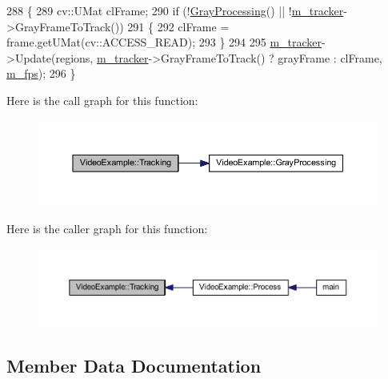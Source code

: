 \begin{DoxyCode}
288 \{
289     cv::UMat clFrame;
290     \textcolor{keywordflow}{if} (!\mbox{\hyperlink{class_video_example_af8ea44f17711129d2b954d1f01fee1f0}{GrayProcessing}}() || !\mbox{\hyperlink{class_video_example_a7c58cd8c883981b2e645d1a3d8edf76a}{m\_tracker}}->GrayFrameToTrack())
291     \{
292         clFrame = frame.getUMat(cv::ACCESS\_READ);
293     \}
294 
295     \mbox{\hyperlink{class_video_example_a7c58cd8c883981b2e645d1a3d8edf76a}{m\_tracker}}->Update(regions, \mbox{\hyperlink{class_video_example_a7c58cd8c883981b2e645d1a3d8edf76a}{m\_tracker}}->GrayFrameToTrack() ? grayFrame : clFrame, 
      \mbox{\hyperlink{class_video_example_ae8110012f8d57f39d6355377cf20fb27}{m\_fps}});
296 \}
\end{DoxyCode}
Here is the call graph for this function\+:
\nopagebreak
\begin{figure}[H]
\begin{center}
\leavevmode
\includegraphics[width=350pt]{class_video_example_af412482dcaad532d958dc31b362ee1c2_cgraph}
\end{center}
\end{figure}
Here is the caller graph for this function\+:
\nopagebreak
\begin{figure}[H]
\begin{center}
\leavevmode
\includegraphics[width=350pt]{class_video_example_af412482dcaad532d958dc31b362ee1c2_icgraph}
\end{center}
\end{figure}


\subsection{Member Data Documentation}
\mbox{\label{class_video_example_aea3c9dd66a3464fab8c61a838aff0ccf}} 
